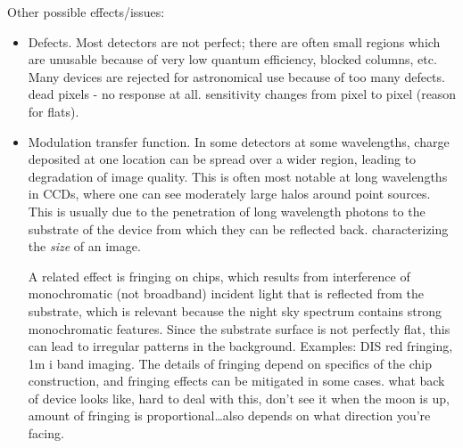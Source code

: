 \documentclass[12pt]{article}
\newcommand{\mynotes}[1]{\textcolor{myBlue}{#1}}
\begin{document}
Other possible effects/issues:
\begin{itemize}
    \item Defects. Most detectors are not perfect; there are often small
        regions which are unusable because of very low quantum efficiency,
        blocked columns, etc. Many devices are rejected for astronomical use
        because of too many defects. \mynotes{dead pixels - no response at all.
        sensitivity changes from pixel to pixel (reason for flats).}
    \item Modulation transfer function. In some detectors at some wavelengths,
        charge deposited at one location can be spread over a wider region,
        leading to degradation of image quality.  This is often most notable at
        long wavelengths in CCDs, where one can see moderately large halos
        around point sources. This is usually due to the penetration of long
        wavelength photons to the substrate of the device from which they can
        be reflected back.
        \mynotes{characterizing the \emph{size} of an image.}

        A related effect is fringing on chips, which results from interference
        of monochromatic (not broadband) incident light that is reflected from
        the substrate, which is relevant because the night sky spectrum
        contains strong monochromatic features. Since the substrate surface is
        not perfectly flat, this can lead to irregular patterns in the
        background. Examples: DIS red fringing, 1m i band imaging. The details
        of fringing depend on specifics of the chip construction, and fringing
        effects can be mitigated in some cases. \mynotes{what back of device
        looks like, hard to deal with this, don't see it when the moon is up,
        amount of fringing is proportional\ldots also depends on what direction
        you're facing.}


\end{itemize}
\end{document}
